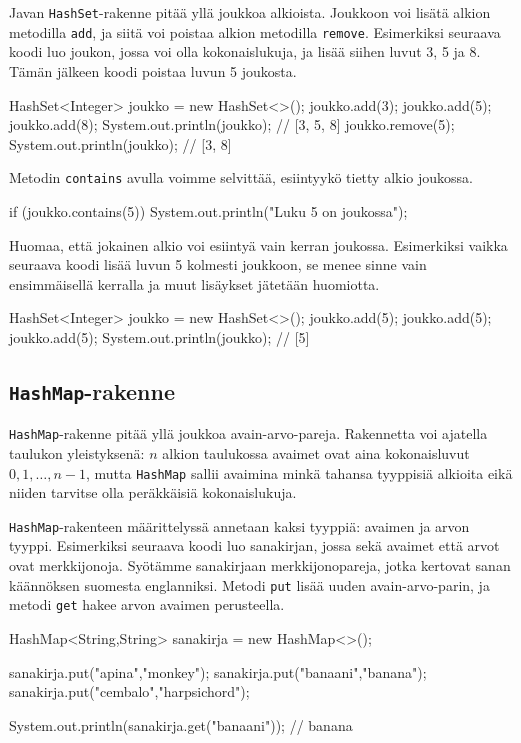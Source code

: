 Javan \texttt{HashSet}-rakenne pitää yllä joukkoa alkioista.
Joukkoon voi lisätä alkion metodilla \texttt{add},
ja siitä voi poistaa alkion metodilla \texttt{remove}.
Esimerkiksi seuraava koodi luo joukon, jossa voi olla
kokonaislukuja, ja lisää siihen luvut 3, 5 ja 8.
Tämän jälkeen koodi poistaa luvun 5 joukosta.

\begin{code}
HashSet<Integer> joukko = new HashSet<>();
joukko.add(3);
joukko.add(5);
joukko.add(8);
System.out.println(joukko); // [3, 5, 8]
joukko.remove(5);
System.out.println(joukko); // [3, 8]
\end{code}

Metodin \texttt{contains} avulla voimme selvittää,
esiintyykö tietty alkio joukossa.

\begin{code}
if (joukko.contains(5)) {
    System.out.println("Luku 5 on joukossa");
}
\end{code}

Huomaa, että jokainen alkio voi esiintyä vain kerran joukossa.
Esimerkiksi vaikka seuraava koodi lisää luvun 5 kolmesti
joukkoon, se menee sinne vain ensimmäisellä kerralla ja
muut lisäykset jätetään huomiotta.

\begin{code}
HashSet<Integer> joukko = new HashSet<>();
joukko.add(5);
joukko.add(5);
joukko.add(5);
System.out.println(joukko); // [5]
\end{code}

\subsection{\texttt{HashMap}-rakenne}

\texttt{HashMap}-rakenne pitää yllä joukkoa avain-arvo-pareja.
Rakennetta voi ajatella taulukon yleistyksenä:
$n$ alkion taulukossa avaimet ovat aina kokonaisluvut
$0,1,\ldots,n-1$, mutta \texttt{HashMap} sallii
avaimina minkä tahansa tyyppisiä alkioita eikä niiden
tarvitse olla peräkkäisiä kokonaislukuja.

\texttt{HashMap}-rakenteen määrittelyssä annetaan
kaksi tyyppiä: avaimen ja arvon tyyppi.
Esimerkiksi seuraava koodi luo sanakirjan, jossa sekä
avaimet että arvot ovat merkkijonoja.
Syötämme sanakirjaan merkkijonopareja, jotka kertovat
sanan käännöksen suomesta englanniksi.
Metodi \texttt{put} lisää uuden avain-arvo-parin,
ja metodi \texttt{get} hakee arvon avaimen perusteella.

\begin{code}
HashMap<String,String> sanakirja = new HashMap<>();

sanakirja.put("apina","monkey");
sanakirja.put("banaani","banana");
sanakirja.put("cembalo","harpsichord");

System.out.println(sanakirja.get("banaani")); // banana
\end{code}

